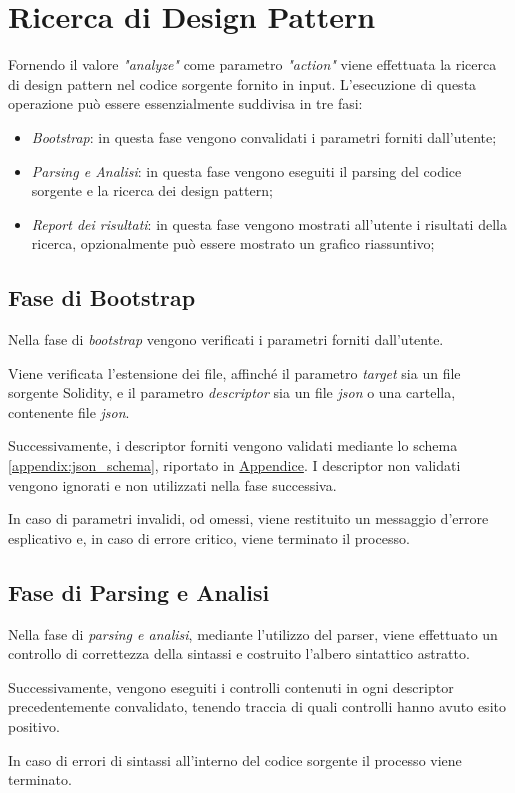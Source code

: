 \section{Ricerca di Design Pattern}
Fornendo il valore \textit{"analyze"} come parametro \textit{"action"} viene effettuata la ricerca di design pattern nel codice sorgente fornito in input. L'esecuzione di questa operazione può essere essenzialmente suddivisa in tre fasi:
\begin{itemize}
	\item \textit{Bootstrap}: in questa fase vengono convalidati i parametri forniti dall'utente;
	\item \textit{Parsing e Analisi}: in questa fase vengono eseguiti il parsing del codice sorgente e la ricerca dei design pattern;
	\item \textit{Report dei risultati}: in questa fase vengono mostrati all'utente i risultati della ricerca, opzionalmente può essere mostrato un grafico riassuntivo;
\end{itemize}

\subsection{Fase di Bootstrap}
Nella fase di \textit{bootstrap} vengono verificati i parametri forniti dall'utente.\par
Viene verificata l'estensione dei file, affinché il parametro \textit{target} sia un file sorgente Solidity, e il parametro \textit{descriptor} sia un file \textit{json} o una cartella, contenente file \textit{json}.\par
Successivamente, i descriptor forniti vengono validati mediante lo schema \ref{appendix:json_schema}, riportato in \hyperref[appendix:codici]{Appendice}. I descriptor non validati vengono ignorati e non utilizzati nella fase successiva.\par
In caso di parametri invalidi, od omessi, viene restituito un messaggio d'errore esplicativo e, in caso di errore critico, viene terminato il processo.
\newpage
\subsection{Fase di Parsing e Analisi}
Nella fase di \textit{parsing e analisi}, mediante l'utilizzo del parser, viene effettuato un controllo di correttezza della sintassi e costruito l'albero sintattico astratto.\par
Successivamente, vengono eseguiti i controlli contenuti in ogni descriptor precedentemente convalidato, tenendo traccia di quali controlli hanno avuto esito positivo.\par
In caso di errori di sintassi all'interno del codice sorgente il processo viene terminato.


